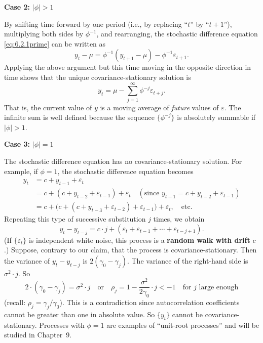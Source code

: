 \medskip
\noindent\textbf{Case 2:} $|\phi| > 1$

By shifting time forward by one period (i.e., by replacing ``$t$'' by ``$t+1$''), multiplying
both sides by $\phi^{-1}$, and rearranging, the stochastic difference equation \eqref{eq:6.2.1prime}
can be written as
\begin{equation}
  y_t - \mu = \phi^{-1}(y_{t+1} - \mu) - \phi^{-1} \varepsilon_{t+1}.
  \label{eq:6.2.3}
\end{equation}
Applying the above argument but this time moving in the opposite direction in time
shows that the unique covariance-stationary solution is
\begin{equation}
  y_t = \mu - \sum_{j=1}^{\infty} \phi^{-j} \varepsilon_{t+j}.
  \label{eq:6.2.4}
\end{equation}
That is, the current value of $y$ is a moving average of \emph{future} values of $\varepsilon$. The infinite
sum is well defined because the sequence $\{\phi^{-j}\}$ is absolutely summable if $|\phi| > 1$.

\medskip
\noindent\textbf{Case 3:} $|\phi| = 1$

The stochastic difference equation has no covariance-stationary solution. For example,
if $\phi = 1$, the stochastic difference equation becomes
\begin{align*}
  y_t &= c + y_{t-1} + \varepsilon_t \\
  &= c + (c + y_{t-2} + \varepsilon_{t-1}) + \varepsilon_t \quad (\text{since } y_{t-1} = c + y_{t-2} + \varepsilon_{t-1}) \\
  &= c + \bigl(c + (c + y_{t-3} + \varepsilon_{t-2}) + \varepsilon_{t-1}\bigr) + \varepsilon_t, \quad \text{etc.}
\end{align*}
Repeating this type of successive substitution $j$ times, we obtain
\[
  y_t - y_{t-j} = c \cdot j + (\varepsilon_t + \varepsilon_{t-1} + \cdots + \varepsilon_{t-j+1}).
\]
(If $\{\varepsilon_t\}$ is independent white noise, this process is a \textbf{random walk with drift} $c$.)
Suppose, contrary to our claim, that the process is covariance-stationary. Then the
variance of $y_t - y_{t-j}$ is $2(\gamma_0 - \gamma_j)$. The variance of the right-hand side is $\sigma^2 \cdot j$. So
\[
  2 \cdot (\gamma_0 - \gamma_j) = \sigma^2 \cdot j \quad \text{or} \quad
  \rho_j = 1 - \frac{\sigma^2}{2\gamma_0} \cdot j < -1 \quad \text{for $j$ large enough}
\]
(recall: $\rho_j = \gamma_j / \gamma_0$).
This is a contradiction since autocorrelation coefficients cannot be greater than one
in absolute value. So $\{y_t\}$ cannot be covariance-stationary. Processes with $\phi = 1$
are examples of ``unit-root processes'' and will be studied in Chapter~9.

